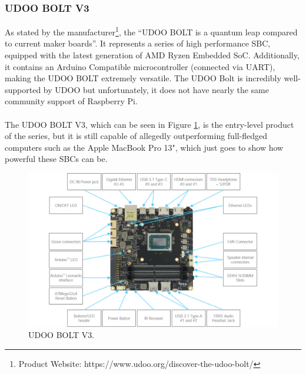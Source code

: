 \subsubsection{UDOO BOLT V3}

As stated by the manufacturer\footnote{Product Website: https://www.udoo.org/discover-the-udoo-bolt/}, the ``UDOO BOLT is a quantum leap compared to current maker boards''. It represents a series of high performance \acs{SBC}, equipped with the latest generation of AMD Ryzen Embedded SoC. Additionally, it contains an Arduino Compatible microcontroller (connected via UART), making the UDOO BOLT extremely versatile.
The UDOO Bolt is incredibly well-supported by UDOO but unfortunately, it does not have nearly the same community support of Raspberry Pi.

\paragraph{} The UDOO BOLT V3, which can be seen in Figure \ref{fig:udoobolt-image}, is the entry-level product of the series, but it is still capable of allegedly outperforming full-fledged computers such as the Apple MacBook Pro 13", which just goes to show how powerful these \acs{SBC}s can be.


\begin{figure}[H]
    \centering
    \includegraphics[width=\linewidth]{images/UDOO_BOLT_GEAR_BLT.png}
    \caption{UDOO BOLT V3.}
    \label{fig:udoobolt-image}
\end{figure}

